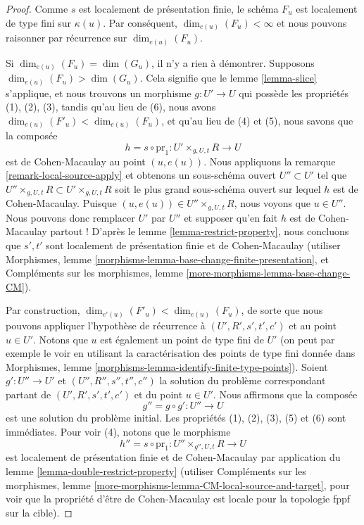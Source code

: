 \begin{proof}
Comme $s$ est localement de présentation finie, le schéma $F_u$ est
localement de type fini sur $\kappa(u)$. Par conséquent,
$\dim_{e(u)}(F_u) < \infty$ et nous pouvons raisonner par récurrence sur
$\dim_{e(u)}(F_u)$.

\medskip\noindent
Si $\dim_{e(u)}(F_u) = \dim(G_u)$, il n'y a rien à démontrer.
Supposons $\dim_{e(u)}(F_u) > \dim(G_u)$. Cela signifie que le
lemme \ref{lemma-slice}
s'applique, et nous trouvons un morphisme $g : U' \to U$ qui possède
les propriétés (1), (2), (3), tandis qu'au lieu de (6), nous avons
$\dim_{e(u)}(F'_u) < \dim_{e(u)}(F_u)$,
et qu'au lieu de (4) et (5), nous savons que la composée
$$
h = s \circ \text{pr}_1 : U' \times_{g, U, t} R \longrightarrow U
$$
est de Cohen-Macaulay au point $(u, e(u))$. Nous appliquons la
remarque \ref{remark-local-source-apply}
et obtenons un sous-schéma ouvert $U'' \subset U'$ tel que
$U'' \times_{g, U, t} R \subset U' \times_{g, U, t} R$
soit le plus grand sous-schéma ouvert sur lequel $h$ est de Cohen-Macaulay.
Puisque $(u, e(u)) \in U'' \times_{g, U, t} R$, nous voyons que $u \in U''$.
Nous pouvons donc remplacer $U'$ par $U''$ et supposer qu'en fait $h$ est
de Cohen-Macaulay partout ! D'après le
lemme \ref{lemma-restrict-property},
nous concluons que $s', t'$ sont localement de
présentation finie et de Cohen-Macaulay (utiliser
Morphismes, lemme \ref{morphisms-lemma-base-change-finite-presentation},
et
Compléments sur les morphismes, lemme \ref{more-morphisms-lemma-base-change-CM}).

\medskip\noindent
Par construction, $\dim_{e'(u)}(F'_u) < \dim_{e(u)}(F_u)$,
de sorte que nous pouvons appliquer l'hypothèse de récurrence à $(U', R', s', t', c')$
et au point $u \in U'$. Notons que $u$ est également un point de type fini
de $U'$ (on peut par exemple le voir en utilisant la caractérisation des
points de type fini donnée dans
Morphismes, lemme \ref{morphisms-lemma-identify-finite-type-points}).
Soient $g' : U'' \to U'$ et $(U'', R'', s'', t'', c'')$ la solution
du problème correspondant partant de $(U', R', s', t', c')$
et du point $u \in U'$. Nous affirmons que la composée
$$
g'' = g \circ g' : U'' \longrightarrow U
$$
est une solution du problème initial. Les propriétés (1), (2), (3), (5)
et (6) sont immédiates. Pour voir (4), notons que le morphisme
$$
h'' = s \circ \text{pr}_1 : U'' \times_{g'', U, t} R \longrightarrow U
$$
est localement de présentation finie et de Cohen-Macaulay par application du
lemme \ref{lemma-double-restrict-property}
(utiliser
Compléments sur les morphismes, lemme \ref{more-morphisms-lemma-CM-local-source-and-target},
pour voir que la propriété d'être de Cohen-Macaulay est locale pour la topologie fppf sur la cible).
\end{proof}


